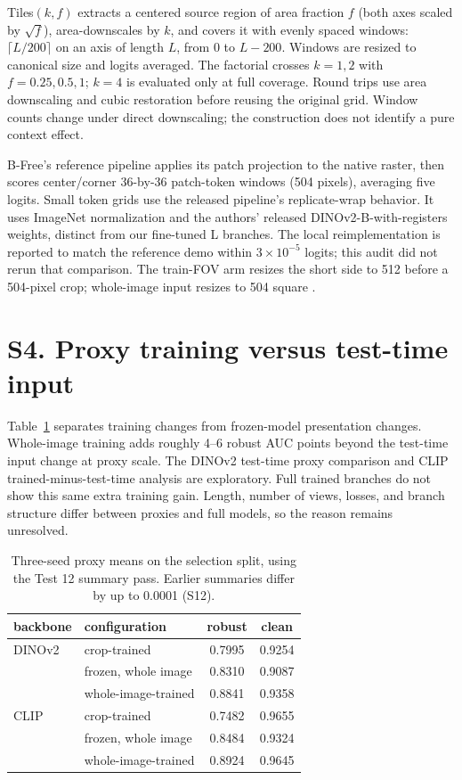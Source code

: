 \documentclass[letterpaper]{article}
\begin{document}
Tiles$(k,f)$ extracts a centered source region of area fraction $f$ (both axes scaled by $\sqrt f$), area-downscales by $k$, and covers it with evenly spaced windows: $\lceil L/200\rceil$ on an axis of length $L$, from 0 to $L-200$. Windows are resized to canonical size and logits averaged. The factorial crosses $k=1,2$ with $f=0.25,0.5,1$; $k=4$ is evaluated only at full coverage. Round trips use area downscaling and cubic restoration before reusing the original grid. Window counts change under direct downscaling; the construction does not identify a pure context effect.

B-Free's reference pipeline applies its patch projection to the native raster, then scores center/corner 36-by-36 patch-token windows (504 pixels), averaging five logits. Small token grids use the released pipeline's replicate-wrap behavior. It uses ImageNet normalization and the authors' released DINOv2-B-with-registers weights, distinct from our fine-tuned L branches. The local reimplementation is reported to match the reference demo within $3\times10^{-5}$ logits; this audit did not rerun that comparison. The train-FOV arm resizes the short side to 512 before a 504-pixel crop; whole-image input resizes to 504 square \cite{guillaro2025bfree}.

\section{S4. Proxy training versus test-time input}

Table~\ref{tab:proxy} separates training changes from frozen-model presentation changes. Whole-image training adds roughly 4--6 robust AUC points beyond the test-time input change at proxy scale. The DINOv2 test-time proxy comparison and CLIP trained-minus-test-time analysis are exploratory. Full trained branches do not show this same extra training gain. Length, number of views, losses, and branch structure differ between proxies and full models, so the reason remains unresolved.

\begin{table}[t]
\centering\small
\begin{tabular}{llcc}
\toprule
backbone & configuration & robust & clean \\
\midrule
DINOv2 & crop-trained & 0.7995 & 0.9254 \\
 & frozen, whole image & 0.8310 & 0.9087 \\
 & whole-image-trained & 0.8841 & 0.9358 \\
CLIP & crop-trained & 0.7482 & 0.9655 \\
 & frozen, whole image & 0.8484 & 0.9324 \\
 & whole-image-trained & 0.8924 & 0.9645 \\
\bottomrule
\end{tabular}
\caption{Three-seed proxy means on the selection split, using the Test 12 summary pass. Earlier summaries differ by up to 0.0001 (S12).}
\label{tab:proxy}
\end{table}
\end{document}
